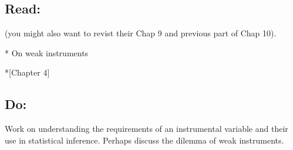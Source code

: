 \documentclass[10pt]{article}
\def\themonth{\ifcase\month\or
  January\or February\or March\or April\or May\or June\or
  July\or August\or September\or October\or November\or December\fi}
\begin{document}
\subsection{Read:}
\citealp{Angrist:etal:1996}

\citealp{dunning2008model}

\citealp{sovey2011instrumental}

\citealp[Chap 10.4--10.5]{gelman2007dau} (you might also want to revist their Chap 9 and previous part of Chap 10).

*\citealp{ImbRos:2005:Robu} On weak instruments

*\citealp{angrist2009mostly}[Chapter 4]

\subsection{Do:} Work on understanding the requirements of an
instrumental variable and their use in statistical inference. Perhaps
discuss the dilemma of weak instruments.








\end{document}
